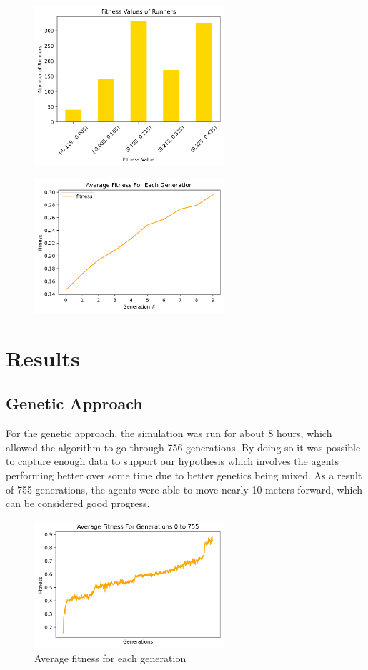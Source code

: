 \documentclass[letterpaper]{article} %
\begin{document}
\begin{figure}[h]
\caption
\centering
\includegraphics[width=7cm]{fitness_dist.png}
\end{figure}

\begin{figure}[h]
\caption
\centering
\includegraphics[width=7cm]{avg_fitness_per_gen.png}
\end{figure}

\section{Results}
\subsection{Genetic Approach}
For the genetic approach, the simulation was run for about 8 hours, which allowed the algorithm to go through 756 generations. By doing so it was possible to capture enough data to support our hypothesis which involves the agents performing better over some time due to better genetics being mixed. As a result of 755 generations, the agents were able to move nearly 10 meters forward, which can be considered good progress. 

\begin{figure}[h]
\caption{Average fitness for each generation}
\centering
\includegraphics[width=7cm]{avg_fitness_per_gen_2.png}
\end{figure}
\end{document}
